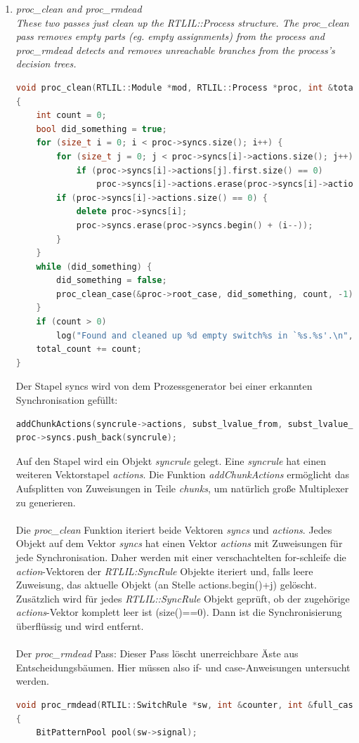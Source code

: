 \documentclass[11pt]{report}
\begin{document}
\begin{enumerate}
  \item \textit{proc\_clean and proc\_rmdead\\
These two passes just clean up the RTLIL::Process structure. The proc\_clean pass removes empty parts (eg. empty assignments) from the process and proc\_rmdead detects and removes unreachable branches from the process’s decision trees.}
\begin{lstlisting}[language=C++]
void proc_clean(RTLIL::Module *mod, RTLIL::Process *proc, int &total_count)
{
	int count = 0;
	bool did_something = true;
	for (size_t i = 0; i < proc->syncs.size(); i++) {
		for (size_t j = 0; j < proc->syncs[i]->actions.size(); j++)
			if (proc->syncs[i]->actions[j].first.size() == 0)
				proc->syncs[i]->actions.erase(proc->syncs[i]->actions.begin() + (j--));
		if (proc->syncs[i]->actions.size() == 0) {
			delete proc->syncs[i];
			proc->syncs.erase(proc->syncs.begin() + (i--));
		}
	}
	while (did_something) {
		did_something = false;
		proc_clean_case(&proc->root_case, did_something, count, -1);
	}
	if (count > 0)
		log("Found and cleaned up %d empty switch%s in `%s.%s'.\n", count, count == 1 ? "" : "es", mod->name.c_str(), proc->name.c_str());
	total_count += count;
}
\end{lstlisting}
Der Stapel syncs wird von dem Prozessgenerator bei einer erkannten Synchronisation gefüllt:
\begin{lstlisting}[language=C++]
addChunkActions(syncrule->actions, subst_lvalue_from, subst_lvalue_to, true);
proc->syncs.push_back(syncrule);
\end{lstlisting}
Auf den Stapel wird ein Objekt \textit{syncrule} gelegt. Eine \textit{syncrule} hat einen weiteren Vektorstapel \textit{actions}.
Die Funktion \textit{addChunkActions} ermöglicht das Aufsplitten von Zuweisungen  in Teile \textit{chunks}, um natürlich große Multiplexer zu generieren.
\\
\\
Die \textit{proc\_clean} Funktion iteriert beide Vektoren \textit{syncs} und \textit{actions}. Jedes Objekt auf dem Vektor \textit{syncs} hat einen Vektor \textit{actions} mit Zuweisungen für jede Synchronisation. Daher werden mit einer verschachtelten for-schleife die \textit{action}-Vektoren der \textit{RTLIL:SyncRule} Objekte iteriert und, falls leere Zuweisung, das aktuelle Objekt (an Stelle actions.begin()+j) gelöscht.
Zusätzlich wird für jedes \textit{RTLIL::SyncRule} Objekt geprüft, ob der zugehörige \textit{actions}-Vektor komplett leer ist (size()==0). Dann ist die Synchronisierung überflüssig und wird entfernt.
\\
\\
Der \textit{proc\_rmdead} Pass:
Dieser Pass löscht unerreichbare Äste aus Entscheidungsbäumen.
Hier müssen also if- und case-Anweisungen untersucht werden.
\begin{lstlisting}[language=C++]
void proc_rmdead(RTLIL::SwitchRule *sw, int &counter, int &full_case_counter)
{
	BitPatternPool pool(sw->signal);


\end{lstlisting}
\end{enumerate}
\end{document}
